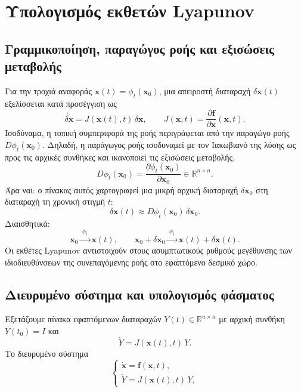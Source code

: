 \documentclass[11pt,a4paper]{report}
\begin{document}
\section{Υπολογισμός εκθετών Lyapunov}

\subsection{Γραμμικοποίηση, παραγώγος ροής και εξισώσεις μεταβολής}
Για την τροχιά αναφοράς $\mathbf{x}(t)=\phi_t(\mathbf{x}_0)$, μια απειροστή διαταραχή $\delta\mathbf{x}(t)$ εξελίσσεται κατά προσέγγιση ως
\begin{equation}
\dot{\delta\mathbf{x}} = J(\mathbf{x}(t),t)\,\delta\mathbf{x},
\qquad
J(\mathbf{x},t)=\frac{\partial \mathbf{f}}{\partial \mathbf{x}}(\mathbf{x},t).
\end{equation}
Ισοδύναμα, η τοπική συμπεριφορά της ροής περιγράφεται από την παραγώγο ροής
$D\phi_t(\mathbf{x}_0)$.
Δηλαδή, η παράγωγος ροής ισοδυναμεί με τον Ιακωβιανό της λύσης ως προς τις
αρχικές συνθήκες και ικανοποιεί τις εξισώσεις μεταβολής.
\begin{equation}
D\phi_t(\mathbf{x}_0)=\frac{\partial \phi_t(\mathbf{x}_0)}{\partial \mathbf{x}_0}\in\mathbb{R}^{n\times n}.
\end{equation}
Άρα ναι: ο πίνακας αυτός χαρτογραφεί μια μικρή αρχική διαταραχή
$\delta\mathbf{x}_0$ στη διαταραχή τη χρονική στιγμή $t$:
\begin{equation}
\delta\mathbf{x}(t)\approx D\phi_t(\mathbf{x}_0)\,\delta\mathbf{x}_0.
\end{equation}
Διαισθητικά:
\begin{equation}
\mathbf{x}_0 \xrightarrow{\;\phi_t\;} \mathbf{x}(t),\qquad
\mathbf{x}_0+\delta\mathbf{x}_0 \xrightarrow{\;\phi_t\;} \mathbf{x}(t)+\delta\mathbf{x}(t).
\end{equation}
Οι εκθέτες Lyapunov αντιστοιχούν στους ασυμπτωτικούς ρυθμούς μεγέθυνσης των ιδιοδιευθύνσεων της συνεπαγόμενης ροής στο εφαπτόμενο δεσμικό χώρο.

\subsection{Διευρυμένο σύστημα και υπολογισμός φάσματος}
Εξετάζουμε πίνακα εφαπτόμενων διαταραχών $Y(t)\in\mathbb{R}^{n\times n}$ με αρχική συνθήκη $Y(t_0)=I$ και
\begin{equation}
\dot{Y} = J(\mathbf{x}(t),t)\,Y.
\end{equation}
Το διευρυμένο σύστημα
\begin{equation}
\begin{cases}
\dot{\mathbf{x}} = \mathbf{f}(\mathbf{x},t),\\
\dot{Y} = J(\mathbf{x}(t),t)\,Y,
\end{cases}
\end{equation}
\end{document}
